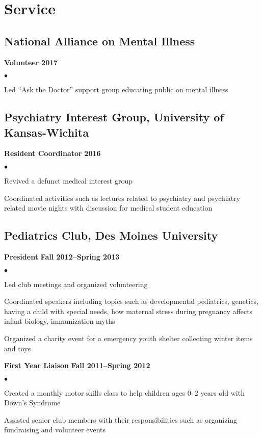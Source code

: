 \documentclass[11pt,letterpaper]{article}
\renewenvironment{itemize}{
  \begin{list}{}{
      \setlength{\leftmargin}{1.5em}
      \setlength{\itemsep}{0.25em}
      \setlength{\parskip}{0pt}
      \setlength{\parsep}{0.25em}
    }
  }{
  \end{list}
}
\newenvironment{bitemize}{
  \begin{list}{\(\bullet \)}{
      \setlength{\leftmargin}{1.5em}
      \setlength{\itemsep}{0.25em}
      \setlength{\parskip}{0pt}
      \setlength{\parsep}{0.25em}
    }
  }{
  \end{list}
}
\newcommand{\yearrange}[1]{\hfill \textbf{#1} \par}
\begin{document}
\section*{Service}
\subsection*{National Alliance on Mental Illness}
\begin{itemize}
  \item \textbf{Volunteer} \yearrange{2017}
  \begin{bitemize}
    \item Led ``Ask the Doctor'' support group educating public on mental illness
  \end{bitemize}
\end{itemize}

\subsection*{Psychiatry Interest Group, University of Kansas-Wichita}
\begin{itemize}
  \item \textbf{Resident Coordinator} \yearrange{2016}
  \begin{bitemize}
    \item Revived a defunct medical interest group
    \item Coordinated activities such as lectures 
      related to psychiatry and psychiatry related movie nights with discussion for medical student education
  \end{bitemize}
\end{itemize}

\subsection*{Pediatrics Club, Des Moines University}
\begin{itemize}
\item \textbf{President} \yearrange{Fall 2012--Spring 2013}
  \begin{bitemize}
  \item Led club meetings and organized volunteering
  \item Coordinated speakers including topics such as developmental
    pediatrics, genetics, having a child with special needs, how
    maternal stress during pregnancy affects infant biology,
    immunization myths
  \item Organized a charity event for a emergency youth shelter
    collecting winter items and toys
  \end{bitemize}
\item \textbf{First Year Liaison} \yearrange{Fall 2011--Spring 2012}
  \begin{bitemize}
  \item Created a monthly motor skills class to help children ages 0--2 years old with Down's Syndrome
  \item Assisted senior club members with their responsibilities such as organizing fundraising and volunteer events
  \end{bitemize}
\end{itemize}
\end{document}
